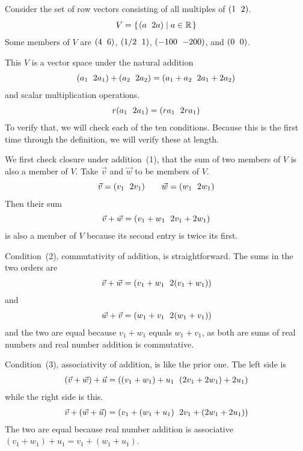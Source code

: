 \documentclass[10pt,t]{beamer}
\begin{document}
\begin{frame}
\ex
Consider the set of row vectors
consisting of all multiples of $\rowvec{1 &2}$.
\begin{equation*}
  V=\set{\rowvec{a  &2a}\suchthat a\in\Re}
\end{equation*}
Some members of $V$ are $\rowvec{4 &6}$, $\rowvec{1/2 &1}$,
$\rowvec{-100 &-200}$, and $\rowvec{0 &0}$.

\pause
This $V$
is a vector space under the natural addition
\begin{equation*}
  \rowvec{a_1 &2a_1}+\rowvec{a_2 &2a_2}
  =
  \rowvec{a_1+a_2 &2a_1+2a_2}
\end{equation*}
and scalar multiplication operations.
\begin{equation*}
  r\rowvec{a_1 &2a_1}
  =
  \rowvec{ra_1 &2ra_1}
\end{equation*}
To verify that, we will check each of the ten conditions.
Because this is the first time through the definition,
we will verify these at length.
\end{frame}\begin{frame}
We first check closure under addition~(1),
that the sum of two members of $V$
is also a member of $V$.
Take $\vec{v}$ and  $\vec{w}$ to be members of $V$.
\begin{equation*}
  \vec{v}=\rowvec{v_1 &2v_1}
  \qquad
  \vec{w}=\rowvec{w_1 &2w_1}  
\end{equation*}
Then their sum
\begin{equation*}
  \vec{v}+\vec{w}=
  \rowvec{v_1+w_1 &2v_1+2w_1}
\end{equation*} 
is also a member of $V$ because its second entry is twice its first.

\pause
Condition~(2), commutativity of addition, is straightforward.
The sums in the two orders are
\begin{equation*}
  \vec{v}+\vec{w}=\rowvec{v_1+w_1 &2(v_1+w_1)}
\end{equation*}
and
\begin{equation*}
  \vec{w}+\vec{v}
  =
  \rowvec{w_1+v_1 &2(w_1+v_1)}  
\end{equation*}
and the two are equal because 
$v_1+w_1$ equals $w_1+v_1$, as both are sums of real numbers
and real number addition is commutative.
\end{frame}\begin{frame}
Condition~(3), associativity of addition, is like the prior one.
The left side is 
\begin{equation*}
  (\vec{v}+\vec{w})+\vec{u}=\rowvec{(v_1+w_1)+u_1 &(2v_1+2w_1)+2u_1}
\end{equation*}
while the right side is this.
\begin{equation*}
  \vec{v}+(\vec{w}+\vec{u})
  =
  \rowvec{v_1+(w_1+u_1) &2v_1+(2w_1+2u_1)}  
\end{equation*}
The two are equal because real number addition is associative 
$(v_1+w_1)+u_1=v_1+(w_1+u_1)$.


\end{frame}
\end{document}
